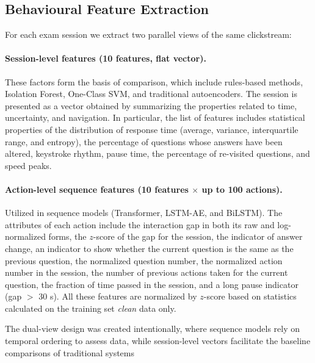 \documentclass[sigconf]{acmart}
\begin{document}
\subsection{Behavioural Feature Extraction}
For each exam session we extract two parallel views of the same clickstream:

\paragraph{Session-level features (10 features, flat vector).} These factors form the basis of comparison, which include rules-based methods, Isolation Forest, One-Class SVM, and traditional autoencoders. The session is presented as a vector obtained by summarizing the properties related to time, uncertainty, and navigation. In particular, the list of features includes statistical properties of the distribution of response time (average, variance, interquartile range, and entropy), the percentage of questions whose answers have been altered, keystroke rhythm, pause time, the percentage of re-visited questions, and speed peaks.

\paragraph{Action-level sequence features (10 features $\times$ up to 100 actions).} Utilized in sequence models (Transformer, LSTM-AE, and BiLSTM). The attributes of each action include the interaction gap in both its raw and log-normalized forms, the $z$-score of the gap for the session, the indicator of answer change, an indicator to show whether the current question is the same as the previous question, the normalized question number, the normalized action number in the session, the number of previous actions taken for the current question, the fraction of time passed in the session, and a long pause indicator (gap $>$ 30 s). All these features are normalized by $z$-score based on statistics calculated on the training set \emph{clean} data only.

The dual-view design was created intentionally, where sequence models rely on temporal ordering to assess data, while session-level vectors facilitate the baseline comparisons of traditional systems
\end{document}

